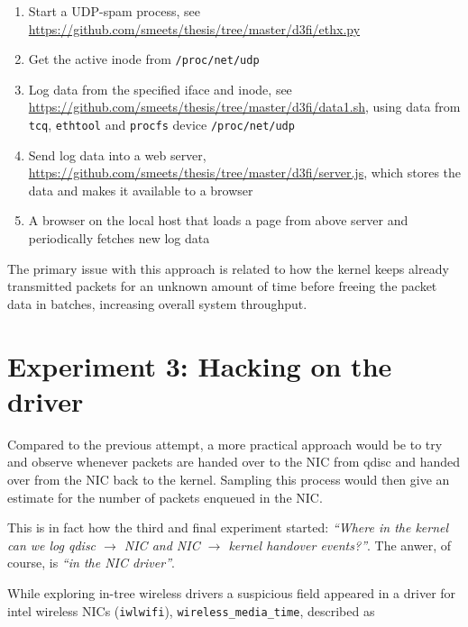 \begin{enumerate}

  \item Start a UDP-spam process, see
  \url{https://github.com/smeets/thesis/tree/master/d3fi/ethx.py}

  \item Get the active inode from \texttt{/proc/net/udp}

  \item Log data from the specified iface and inode, see
  \url{https://github.com/smeets/thesis/tree/master/d3fi/data1.sh}, using data
  from \texttt{tcq}, \texttt{ethtool} and \texttt{procfs} device \texttt{/proc/net/udp}

  \item Send log data into a web server,
  \url{https://github.com/smeets/thesis/tree/master/d3fi/server.js}, which
  stores the data and makes it available to a browser

  \item A browser on the local host that loads a page from above server and
  periodically fetches new log data

\end{enumerate}

The primary issue with this approach is related to how the kernel keeps
already transmitted packets for an unknown amount of time before freeing the
packet data in batches, increasing overall system throughput.


\section{Experiment 3: Hacking on the driver}

Compared to the previous attempt, a more practical approach would be to try
and observe whenever packets are handed over to the NIC from qdisc and handed
over from the NIC back to the kernel. Sampling this process would then give an
estimate for the number of packets enqueued in the NIC.

This is in fact how the third and final experiment started: \emph{``Where in
the kernel can we log qdisc $\rightarrow$ NIC and NIC $\rightarrow$ kernel
handover events?''}. The anwer, of course, is \emph{``in the NIC driver''}.

While exploring in-tree wireless drivers a suspicious field appeared in a
driver for intel wireless NICs (\texttt{iwlwifi}),
\texttt{wireless\_media\_time}, described as



